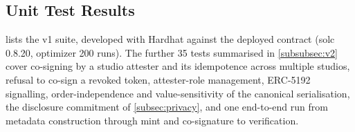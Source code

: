 


\subsection{Unit Test Results}
\label{app:tests}

 lists the v1 suite, developed with Hardhat against the
deployed contract (solc 0.8.20, optimizer 200 runs). The further 35 tests summarised
in \cref{subsubsec:v2} cover co-signing by a studio attester and its idempotence
across multiple studios, refusal to co-sign a revoked token, attester-role
management, ERC-5192 signalling, order-independence and value-sensitivity of the
canonical serialisation, the disclosure commitment of \cref{subsec:privacy}, and one
end-to-end run from metadata construction through mint and co-signature to
verification.

